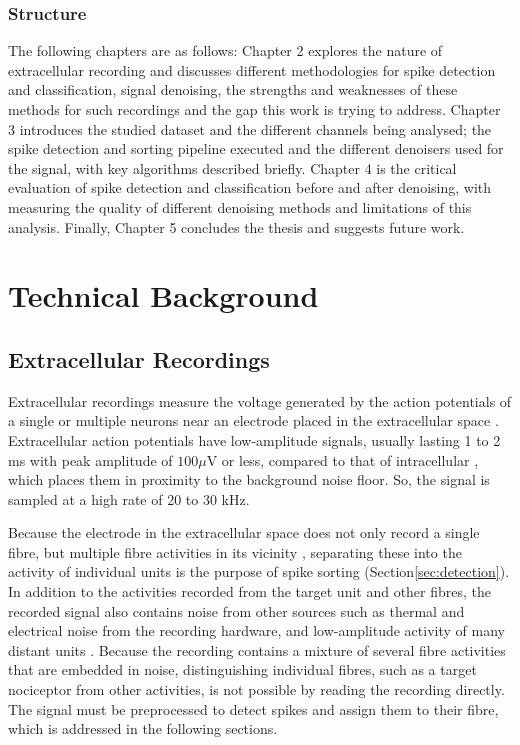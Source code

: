 \documentclass[ %
                    author={Rzan Alkabier},
                    supervisor={Dr. Zahraa Abdallah},
                    degree={MSc},
                     title={Denoising Extracellular Recording for Spike Detection and Classification on Single Channels},
                    subtitle={Does denoising improve detection and classification performance?},
                      type={},
                      year={2026}]{dissertation}
\begin{document}
\subsection{Structure}
The following chapters are as follows: Chapter 2 explores the nature of extracellular recording and discusses different methodologies for spike detection and classification, signal denoising, the strengths and weaknesses of these methods for such recordings and the gap this work is trying to address. Chapter 3 introduces the studied dataset and the different channels being analysed; the spike detection and sorting pipeline executed and the different denoisers used for the signal, with key algorithms described briefly. Chapter 4 is the critical evaluation of spike detection and classification before and after denoising, with measuring the quality of different denoising methods and limitations of this analysis. Finally, Chapter 5 concludes the thesis and suggests future work. 



\chapter{Technical Background}
\label{chap:background}

\section{Extracellular Recordings} 
\label{sec:extracellular}

Extracellular recordings measure the voltage generated by the action potentials of a single or multiple neurons near an electrode placed in the extracellular space \cite{kechris_removing_2021, guo_extracellular_2020, lewicki_review_1998}. Extracellular action potentials have low-amplitude signals, usually lasting 1 to 2 ms with peak amplitude of $100\mu\text{V}$ or less, compared to that of intracellular \cite{hill_quality_2011}, which places them in proximity to the background noise floor. So, the signal is sampled at a high rate of 20 to 30 kHz.
\bigskip

\noindent
Because the electrode in the extracellular space does not only record a single fibre, but multiple fibre activities in its vicinity \cite{lewicki_review_1998}, separating these into the activity of individual units is the purpose of spike sorting (Section\ref{sec:detection}). In addition to the activities recorded from the target unit and other fibres, the recorded signal also contains noise from other sources such as thermal and electrical noise from the recording hardware, and low-amplitude activity of many distant units \cite{azami_extracellular_2015}. Because the recording contains a mixture of several fibre activities that are embedded in noise, distinguishing individual fibres, such as a target nociceptor from other activities, is not possible by reading the recording directly. The signal must be preprocessed to detect spikes and assign them to their fibre, which is addressed in the following sections.  
\end{document}

